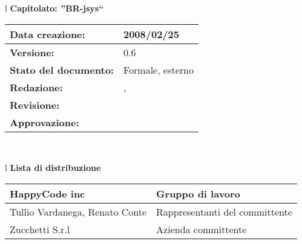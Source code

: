 
\newcommand{\lv}{ 0.6 } %
\newcommand{\dt}{ Manuale Utente }%
\newcommand{\Grammatica}{} %

\begin{center}
\thispagestyle{plain}
\begin{table}[htbp]
\large{
\begin{tabular}{l}
\Large{\textbf{\textsf{Capitolato: ''BR-jsys``}}} \\
\begin{tabular}{|p{6cm}|p{6cm}|} \hline
\textbf{Data creazione:} & 2008/02/25 \\ \hline
\textbf{Versione:} & \lv \\ \hline
\textbf{Stato del documento:} & Formale, esterno \\ \hline
\textbf{Redazione:} &  \AT, \LA \\ \hline
\textbf{Revisione:} & \FC \\ \hline
\textbf{Approvazione:} & \\ \hline
\end{tabular} \\
\end{tabular}
}
\end{table}

\begin{table}[hbtp]
\large{
\begin{tabular}{l}
\Large{\textbf{\textsf{Lista di distribuzione}}} \\

\begin{tabular}{|p{6cm}|p{6cm}|} \hline
{HappyCode inc}& Gruppo di lavoro\\ \hline
{Tullio Vardanega, Renato Conte}& Rappresentanti del committente \\ \hline
{Zucchetti S.r.l}& Azienda committente\\ \hline
\end{tabular} \\
\end{tabular}
}
\end{table}
\begin{table}[hbtp]


\end{table}
\end{center}
